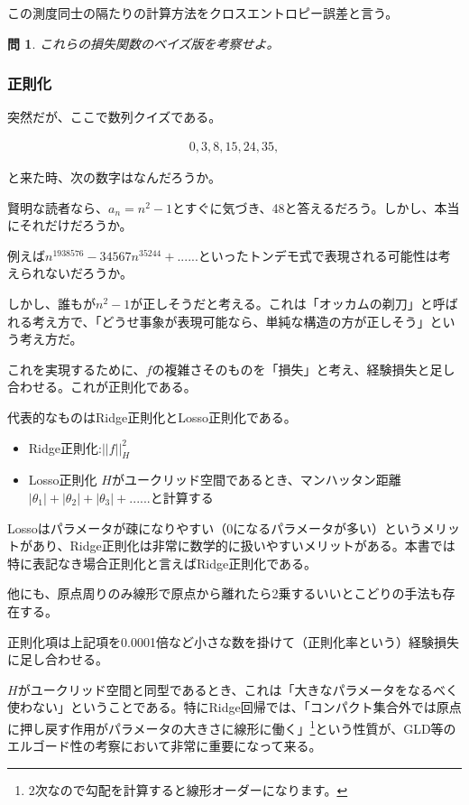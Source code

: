 \documentclass{jsarticle}
\newtheorem{pro}{問}[section]
\begin{document}
この測度同士の隔たりの計算方法をクロスエントロピー誤差と言う。

\begin{pro}
これらの損失関数のベイズ版を考察せよ。
\end{pro}


\subsubsection{正則化}

突然だが、ここで数列クイズである。

\begin{align}
0,3,8,15,24,35,
\end{align}

と来た時、次の数字はなんだろうか。

賢明な読者なら、$a_n=n^2-1$とすぐに気づき、48と答えるだろう。しかし、本当にそれだけだろうか。

例えば$n^1938576-34567n^35244+......$といったトンデモ式で表現される可能性は考えられないだろうか。

しかし、誰もが$n^2-1$が正しそうだと考える。これは「オッカムの剃刀」と呼ばれる考え方で、「どうせ事象が表現可能なら、単純な構造の方が正しそう」という考え方だ。

これを実現するために、$f$の複雑さそのものを「損失」と考え、経験損失と足し合わせる。これが正則化である。

代表的なものはRidge正則化とLosso正則化である。

\begin{itemize} 
\item Ridge正則化:$||f||^2_H$
\item Losso正則化 $H$がユークリッド空間であるとき、マンハッタン距離$|\theta_1|+|\theta_2|+|\theta_3|+......$と計算する
\end{itemize}

Lossoはパラメータが疎になりやすい（0になるパラメータが多い）というメリットがあり、Ridge正則化は非常に数学的に扱いやすいメリットがある。本書では特に表記なき場合正則化と言えばRidge正則化である。

他にも、原点周りのみ線形で原点から離れたら2乗するいいとこどりの手法も存在する。

正則化項は上記項を0.0001倍など小さな数を掛けて（正則化率という）経験損失に足し合わせる。

$H$がユークリッド空間と同型であるとき、これは「大きなパラメータをなるべく使わない」ということである。特にRidge回帰では、「コンパクト集合外では原点に押し戻す作用がパラメータの大きさに線形に働く」\footnote{2次なので勾配を計算すると線形オーダーになります。}という性質が、GLD等のエルゴード性の考察において非常に重要になって来る。
\end{document}
